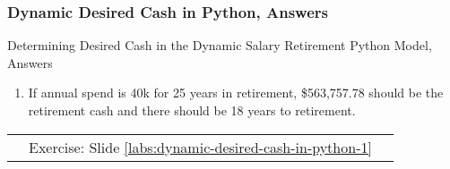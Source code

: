\documentclass[handout, 11pt]{beamer}
\begin{document}
\appendix
{}
\setcounter{finalframe}{\value{framenumber}}
\begin{frame}
\frametitle{Dynamic Desired Cash in Python, Answers}
{
\begin{block}{Determining Desired Cash in the Dynamic Salary Retirement Python Model, Answers}
\begin{enumerate}
\item If annual spend is 40k for 25 years in retirement, \$563,757.78 should be the retirement cash and there should be 18 years to retirement.
\end{enumerate}
\vfill
\begin{tabular*}{\textwidth}{@{\extracolsep{\fill}}ccc}
\toprule
\hfill & Exercise: Slide \textcolor{blue}{\underline{\ref{labs:dynamic-desired-cash-in-python-1}}} & \hfill\\

\end{tabular*}
\end{block}
}
\label{labs:dynamic-desired-cash-in-python-1-answers}
\end{frame}
\setcounter{framenumber}{\value{finalframe}}
\end{document}

